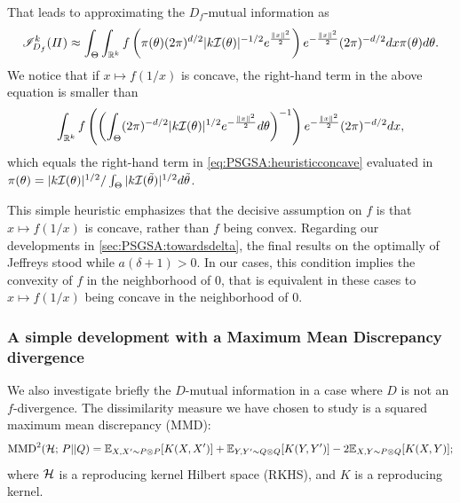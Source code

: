         That leads to approximating the $D_f$-mutual information  as 
            \begin{equation}\label{eq:PSGSA:heuristicconcave}
                \mathscr{I}_{D_f}^k(\varPi) \approx \int_\Theta\int_{\mathbb{R}^k} f\left(\pi(\theta)(2\pi)^{d/2}|k\mathcal{I}(\theta)|^{-1/2}e^{\frac{\|x\|^2}{2}}\right) e^{-\frac{\|x\|^2}{2}} (2\pi)^{-d/2}dx\pi(\theta)d\theta.
            \end{equation}
        We notice that if $x\mapsto f(1/x)$ is concave, the right-hand term in the above equation is smaller than 
            \begin{equation}
                 \int_{\mathbb{R}^k}f\left(\left(\int_\Theta (2\pi)^{-d/2}|k\mathcal{I}(\theta)|^{1/2} e^{-\frac{\|x\|^2}{2}}d\theta\right)^{-1}\right)e^{-\frac{\|x\|^2}{2}}(2\pi)^{-d/2}dx ,
            \end{equation}
        which equals the right-hand term in \cref{eq:PSGSA:heuristicconcave} evaluated in $\pi(\theta) = |k\mathcal{I}(\theta)|^{1/2} / \int_\Theta|k\mathcal{I}(\tilde\theta)|^{1/2} d\tilde\theta$.

        This simple heuristic emphasizes that the decisive assumption on $f$ is that $x\mapsto f(1/x)$ is concave, rather than $f$ being convex.
        Regarding our developments in  \cref{sec:PSGSA:towardsdelta}, the final results on the optimally of Jeffreys stood while $a(\delta+1)>0$.
        In our cases, this condition implies the convexity of $f$ in the neighborhood of $0$, that is equivalent in these cases to $x\mapsto f(1/x)$ being concave in the neighborhood of $0$.
        



        
        \subsubsection{A simple development with a Maximum Mean Discrepancy divergence}


        We also investigate briefly the $D$-mutual information in a case where $D$ is not an $f$-divergence. The dissimilarity measure we have chosen to study is a squared maximum mean discrepancy (MMD):
                \begin{equation}
                    \text{MMD}^2(\mathcal{H};\,P||Q) = \mathbb{E}_{X,X'\sim P\otimes P}[K(X,X')] + \mathbb{E}_{Y,Y'\sim Q\otimes Q}[K(Y,Y')] - 2\mathbb{E}_{X,Y\sim P\otimes Q}[K(X,Y)];
                \end{equation}
        where $\mathcal{H}$ is a reproducing kernel Hilbert space (RKHS), and $K$ is a reproducing kernel.

